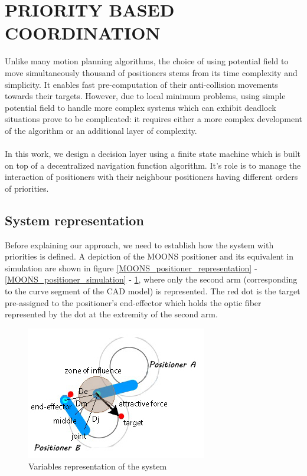\documentclass[]{spie}  %
\begin{document}
	\section{PRIORITY BASED COORDINATION}
	\label{PRIORITY BASED COORDINATION}
	
	
	Unlike many motion planning algorithms, the choice of using potential field to move simultaneously thousand of positioners stems from its time complexity and simplicity. It enables fast pre-computation of their anti-collision movements towards their targets. However, due to local minimum problems, using simple potential field to handle more complex systems which can exhibit deadlock situations prove to be complicated: it requires either a more complex development of the algorithm or an additional layer of complexity.\\\\
	In this work, we design a decision layer using a finite state machine which is built on top of a decentralized navigation function algorithm. It's role is to manage the interaction of positioners with their neighbour positioners having different orders of priorities. 

	\subsection{System representation}	
		\label{Finite-state machine} 
	
	Before explaining our approach, we need to establish how the system with priorities is defined. 
	 A depiction of the MOONS positioner and its equivalent in simulation are shown in figure \ref{MOONS_positioner_representation} - \ref{MOONS_positioner_simulation} - \ref{sys_representation}, where only the second arm (corresponding to the curve segment of the CAD model) is represented. The red dot is the target pre-assigned to the positioner's end-effector which holds the optic fiber represented by the dot at the extremity of the second arm.
		\begin{figure}[H]
			\centering
			\includegraphics[scale=0.56]{images/system_representation.jpg}
			\caption{Variables representation of the system}
			\label{sys_representation}
		\end{figure}
	
\end{document}
